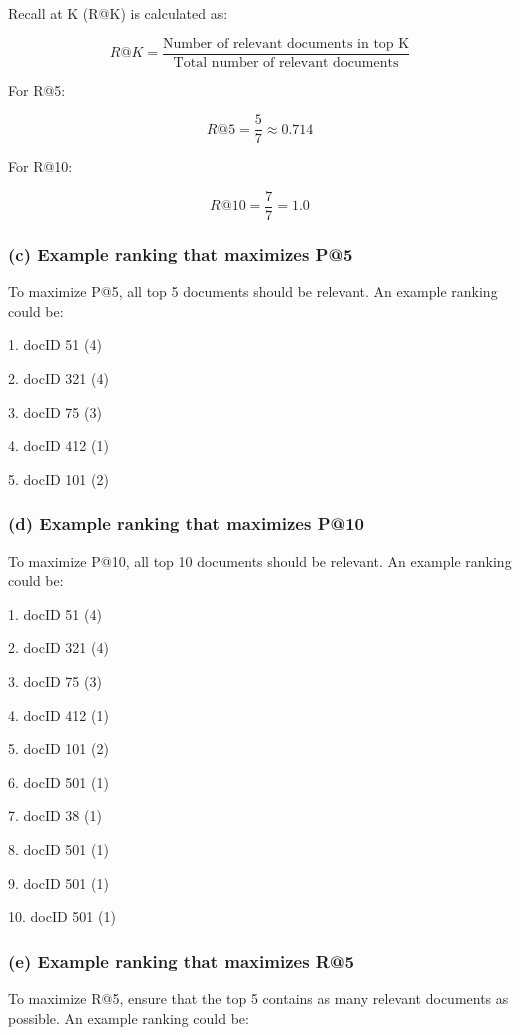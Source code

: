 \documentclass[a4paper, utf8]{ctexart}
\begin{document}
	Recall at K (R@K) is calculated as:
	
	\[
	R@K = \frac{\text{Number of relevant documents in top K}}{\text{Total number of relevant documents}}
	\]
	
	For R@5:
	
	\[
	R@5 = \frac{5}{7} \approx 0.714
	\]
	
	For R@10:
	
	\[
	R@10 = \frac{7}{7} = 1.0
	\]
	
	\subsubsection*{(c) Example ranking that maximizes P@5}
	
	To maximize P@5, all top 5 documents should be relevant. An example ranking could be:
	
	1. docID 51 (4) 
	
	2. docID 321 (4)
	
	3. docID 75 (3) 
	
	4. docID 412 (1) 
	
	5. docID 101 (2) 
	
	\subsubsection*{(d) Example ranking that maximizes P@10}
	
	To maximize P@10, all top 10 documents should be relevant. An example ranking could be:
	
	1. docID 51 (4)  
	
	2. docID 321 (4)  
	
	3. docID 75 (3)  
	
	4. docID 412 (1)  
	
	5. docID 101 (2)  
	
	6. docID 501 (1)  
	
	7. docID 38 (1)  
	
	8. docID 501 (1)  
	
	9. docID 501 (1)  
	
	10. docID 501 (1)  
	
	\subsubsection*{(e) Example ranking that maximizes R@5}
	
	To maximize R@5, ensure that the top 5 contains as many relevant documents as possible. An example ranking could be:
	
\end{document}
